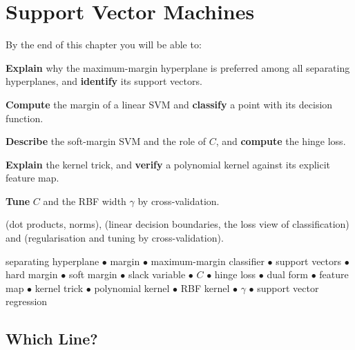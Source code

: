 \chapter{Support Vector Machines}\label{ch:svm}

\begin{outcomes}
By the end of this chapter you will be able to:
\begin{tight}
  \item \textbf{Explain} why the maximum-margin hyperplane is preferred among all
        separating hyperplanes, and \textbf{identify} its support vectors.
  \item \textbf{Compute} the margin of a linear SVM and \textbf{classify} a point
        with its decision function.
  \item \textbf{Describe} the soft-margin SVM and the role of $C$, and
        \textbf{compute} the hinge loss.
  \item \textbf{Explain} the kernel trick, and \textbf{verify} a polynomial kernel
        against its explicit feature map.
  \item \textbf{Tune} $C$ and the RBF width $\gamma$ by cross-validation.
\end{tight}
\end{outcomes}

\begin{prereq}
 (dot products, norms),  (linear decision boundaries,
the loss view of classification) and  (regularisation and
tuning by cross-validation).
\end{prereq}

\begin{keyterms}
separating hyperplane $\bullet$ margin $\bullet$ maximum-margin classifier
$\bullet$ support vectors $\bullet$ hard margin $\bullet$ soft margin $\bullet$
slack variable $\bullet$ $C$ $\bullet$ hinge loss $\bullet$ dual form $\bullet$
feature map $\bullet$ kernel trick $\bullet$ polynomial kernel $\bullet$ RBF
kernel $\bullet$ $\gamma$ $\bullet$ support vector regression
\end{keyterms}

\section{Which Line?}

